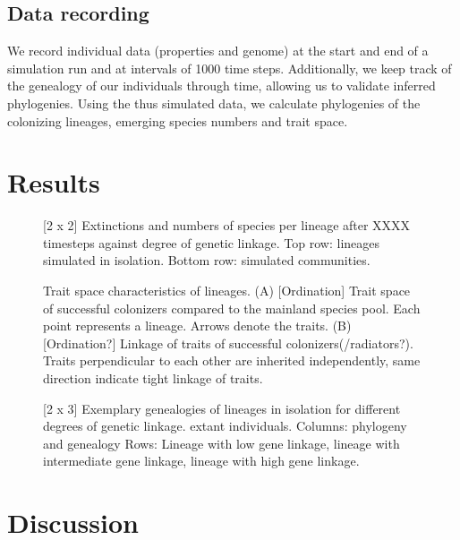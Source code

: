 \documentclass[a4paper]{scrartcl}
\begin{document}
\subsection{Data recording}
We record individual data (properties and genome) at the start and end of a simulation run
and at intervals of 1000 time steps.%
Additionally, we keep track of the genealogy of our individuals through time,
allowing us to validate inferred phylogenies.
Using the thus simulated data, we calculate phylogenies of the colonizing lineages, emerging species numbers and
trait space. %

\section{Results}

\begin{figure}
  \caption{[2 x 2]
    Extinctions and numbers of species per lineage after XXXX timesteps against degree of genetic linkage.
    Top row: lineages simulated in isolation.
    Bottom row: simulated communities.}
  \label{specieslinkage}
\end{figure}

\begin{figure}
  \caption{Trait space characteristics of lineages.
    (A) [Ordination] Trait space of successful colonizers compared to the mainland species pool. Each point represents a lineage.
    Arrows denote the traits.
    (B) [Ordination?] Linkage of traits of successful colonizers(/radiators?). Traits perpendicular to each other are inherited independently,
  same direction indicate tight linkage of traits.}
  \label{traitspace}
\end{figure}

\begin{figure}
  \caption{[2 x 3]
    Exemplary genealogies of lineages in isolation for different degrees of genetic linkage.
    extant individuals.
    Columns: phylogeny and genealogy
    Rows: Lineage with low gene linkage,
    lineage with intermediate gene linkage,
    lineage with high gene linkage.}
  \label{phylogenies}
\end{figure}

\section{Discussion}
\end{document}
